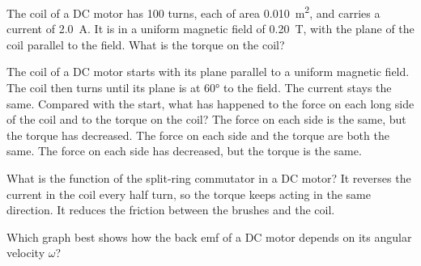 
\begin{quizq}{}
The coil of a DC motor has 100 turns, each of area \qty{0.010}{m^2}, and carries a current of
\qty{2.0}{A}. It is in a uniform magnetic field of \qty{0.20}{T}, with the plane of the coil parallel to
the field. What is the torque on the coil?
\end{quizq}

\begin{quizq}{}
The coil of a DC motor starts with its plane parallel to a uniform magnetic field. The coil then
turns until its plane is at \ang{60} to the field. The current stays the same. Compared with the
start, what has happened to the force on each long side of the coil and to the torque on the coil?
  {The force on each side is the same, but the torque has decreased.}
  {The force on each side and the torque are both the same.}
  {The force on each side has decreased, but the torque is the same.}
\end{quizq}

\begin{quizq}{}
What is the function of the split-ring commutator in a DC motor?
  {It reverses the current in the coil every half turn, so the torque keeps acting in the same
   direction.}
  {It reduces the friction between the brushes and the coil.}
\end{quizq}

\begin{quizq}{}
Which graph best shows how the back emf of a DC motor depends on its angular velocity $\omega$?
  {%
  }
  {%
  }
  {%
  }
\end{quizq}

